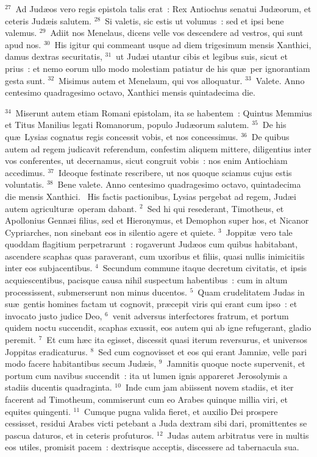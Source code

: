 ${}^{27}$~Ad Jud\ae os vero regis epistola talis erat~: Rex Antiochus senatui Jud\ae orum, et ceteris Jud\ae is salutem.
${}^{28}$~Si valetis, sic estis ut volumus~: sed et ipsi bene valemus.
${}^{29}$~Adiit nos Menelaus, dicens velle vos descendere ad vestros, qui sunt apud nos.
${}^{30}$~His igitur qui commeant usque ad diem trigesimum mensis Xanthici, damus dextras securitatis,
${}^{31}$~ut Jud\ae i utantur cibis et legibus suis, sicut et prius~: et nemo eorum ullo modo molestiam patiatur de his qu\ae\ per ignorantiam gesta sunt.
${}^{32}$~Misimus autem et Menelaum, qui vos alloquatur.
${}^{33}$~Valete. Anno centesimo quadragesimo octavo, Xanthici mensis quintadecima die.


${}^{34}$~Miserunt autem etiam Romani epistolam, ita se habentem~: Quintus Memmius et Titus Manilius legati Romanorum, populo Jud\ae orum salutem.
${}^{35}$~De his qu\ae\ Lysias cognatus regis concessit vobis, et nos concessimus.
${}^{36}$~De quibus autem ad regem judicavit referendum, confestim aliquem mittere, diligentius inter vos conferentes, ut decernamus, sicut congruit vobis~: nos enim Antiochiam accedimus.
${}^{37}$~Ideoque festinate rescribere, ut nos quoque sciamus cujus estis voluntatis.
${}^{38}$~Bene valete. Anno centesimo quadragesimo octavo, quintadecima die mensis Xanthici.
~His factis pactionibus, Lysias pergebat ad regem, Jud\ae i autem agricultur\ae\ operam dabant.
${}^{2}$~Sed hi qui resederant, Timotheus, et Apollonius Genn\ae i filius, sed et Hieronymus, et Demophon super hos, et Nicanor Cypriarches, non sinebant eos in silentio agere et quiete.
${}^{3}$~Joppit\ae\ vero tale quoddam flagitium perpetrarunt~: rogaverunt Jud\ae os cum quibus habitabant, ascendere scaphas quas paraverant, cum uxoribus et filiis, quasi nullis inimicitiis inter eos subjacentibus.
${}^{4}$~Secundum commune itaque decretum civitatis, et ipsis acquiescentibus, pacisque causa nihil suspectum habentibus~: cum in altum processissent, submerserunt non minus ducentos.
${}^{5}$~Quam crudelitatem Judas in su\ae\ gentis homines factam ut cognovit, pr\ae cepit viris qui erant cum ipso~: et invocato justo judice Deo,
${}^{6}$~venit adversus interfectores fratrum, et portum quidem noctu succendit, scaphas exussit, eos autem qui ab igne refugerant, gladio peremit.
${}^{7}$~Et cum h\ae c ita egisset, discessit quasi iterum reversurus, et universos Joppitas eradicaturus.
${}^{8}$~Sed cum cognovisset et eos qui erant Jamni\ae , velle pari modo facere habitantibus secum Jud\ae is,
${}^{9}$~Jamnitis quoque nocte supervenit, et portum cum navibus succendit~: ita ut lumen ignis appareret Jerosolymis a stadiis ducentis quadraginta.
${}^{10}$~Inde cum jam abiissent novem stadiis, et iter facerent ad Timotheum, commiserunt cum eo Arabes quinque millia viri, et equites quingenti.
${}^{11}$~Cumque pugna valida fieret, et auxilio Dei prospere cessisset, residui Arabes victi petebant a Juda dextram sibi dari, promittentes se pascua daturos, et in ceteris profuturos.
${}^{12}$~Judas autem arbitratus vere in multis eos utiles, promisit pacem~: dextrisque acceptis, discessere ad tabernacula sua.


